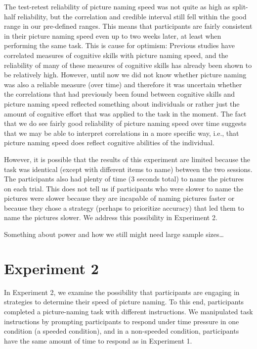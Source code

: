 \documentclass[
  man,floatsintext]{apa6}
\begin{document}
The test-retest reliability of picture naming speed was not quite as high as split-half reliability, but the correlation and credible interval still fell within the good range in our pre-defined ranges. This means that participants are fairly consistent in their picture naming speed even up to two weeks later, at least when performing the same task. This is cause for optimism: Previous studies have correlated measures of cognitive skills with picture naming speed, and the reliability of many of these measures of cognitive skills has already been shown to be relatively high. However, until now we did not know whether picture naming was also a reliable measure (over time) and therefore it was uncertain whether the correlations that had previously been found between cognitive skills and picture naming speed reflected something about individuals or rather just the amount of cognitive effort that was applied to the task in the moment. The fact that we do see fairly good reliability of picture naming speed over time suggests that we may be able to interpret correlations in a more specific way, i.e., that picture naming speed does reflect cognitive abilities of the individual.

However, it is possible that the results of this experiment are limited because the task was identical (except with different items to name) between the two sessions. The participants also had plenty of time (3 seconds total) to name the pictures on each trial. This does not tell us if participants who were slower to name the pictures were slower because they are incapable of naming pictures faster or because they chose a strategy (perhaps to prioritize accuracy) that led them to name the pictures slower. We address this possibility in Experiment 2.

Something about power and how we still might need large sample sizes\ldots{}

\hypertarget{experiment-2}{%
\section{Experiment 2}\label{experiment-2}}

In Experiment 2, we examine the possibility that participants are engaging in strategies to determine their speed of picture naming. To this end, participants completed a picture-naming task with different instructions. We manipulated task instructions by prompting participants to respond under time pressure in one condition (a speeded condition), and in a non-speeded condition, participants have the same amount of time to respond as in Experiment 1.
\end{document}
